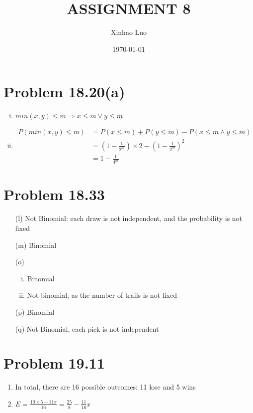 \documentclass{article}
\title{\bf \Large ASSIGNMENT 8}
\author{Xinhao Luo}
\date{\today}
\def\math#1{$#1$}
\begin{document}
\maketitle
\medskip

\section{Problem 18.20(a)}
\begin{enumerate}[i)]
    \item \math{min(x, y) \leq m \Rightarrow x \leq m \lor y \leq m}
    \item \begin{equation}
        \begin{split}
            P(min(x, y) \leq m) &= P(x \leq m) + P(y \leq m) - P(x \leq m \land y \leq m) \\
            &= (1 - \frac{1}{2^{m}}) \times 2 - (1 - \frac{1}{2^m})^2 \\
            &= 1 - \frac{1}{4^m}
        \end{split}
    \end{equation}
\end{enumerate}

\section{Problem 18.33}
\begin{itemize}
    \item [(l)] Not Binomial: each draw is not independent, and the probability is not fixed
    \item [(m)] Binomial
    \item [(o)] \begin{enumerate}[i)]
        \item Binomial
        \item Not binomial, as the number of trails is not fixed
    \end{enumerate}
    \item [(p)] Binomial
    \item [(q)] Not Binomial, each pick is not independent
\end{itemize}

\section{Problem 19.11}
\begin{enumerate}
    \item In total, there are 16 possible outcomes: 11 lose and 5 wins
    \item \math{E = \frac{10 \times 5 - 11 x}{16} = \frac{25}{8} - \frac{11}{16}x}
\end{enumerate}
\end{document}

